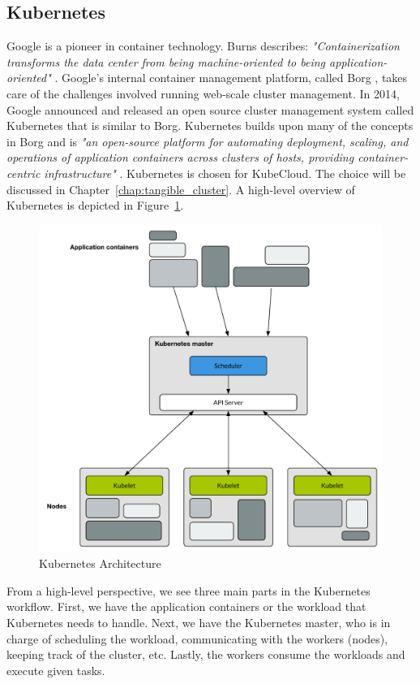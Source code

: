 \subsection*{Kubernetes}
Google is a pioneer in container technology. Burns describes: \textit{"Containerization transforms the data center from being machine-oriented to being application-oriented"} \cite[p. 74]{burns2016borg_omega_kubernetes}. Google's internal container management platform, called Borg \cite{verma2015borg}, takes care of the challenges involved running web-scale cluster management. In 2014, Google announced and released an open source cluster management system called Kubernetes that is similar to Borg. Kubernetes builds upon many of the concepts in Borg and is \textit{"an open-source platform for automating deployment, scaling, and operations of application containers across clusters of hosts, providing container-centric infrastructure"} \cite{kubernetesio}. Kubernetes is chosen for KubeCloud. The choice will be discussed in Chapter~\ref{chap:tangible_cluster}. A high-level overview of Kubernetes is depicted in Figure~\ref{fig:kubernetes_architecture_report}.

\begin{figure}[H]
    \centering
    \includegraphics[width=12cm]{figures/kubernetes/architecture}
    \caption{Kubernetes Architecture}
    \label{fig:kubernetes_architecture_report}
\end{figure}

\noindent
From a high-level perspective, we see three main parts in the Kubernetes workflow. First, we have the application containers or the workload that Kubernetes needs to handle. Next, we have the Kubernetes master, who is in charge of scheduling the workload, communicating with the workers (nodes), keeping track of the cluster, etc. Lastly, the workers consume the workloads and execute given tasks. \\


